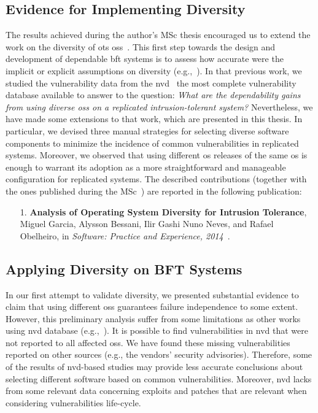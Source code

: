 \subsection{Evidence for Implementing Diversity}%


The results achieved during the author's MSc thesis encouraged us to extend the work on the diversity of \gls{ots} \glspl{os}~\cite{Garcia:2012}.
This first step towards the design and development of dependable \gls{bft} systems is to assess how accurate were the implicit or explicit assumptions on diversity (e.g.,~\cite{Abd-El-Malek:2005,Bessani:2008,Castro:2002,Castro:2003,Clement:2009,Correia:2004,Kapitza:2012,Kotla:2010,Moniz:2011,Yin:2003}).
In that previous work, we studied the vulnerability data from the \gls{nvd}~\cite{nvd} the most complete vulnerability database available to answer to the question:
\emph{What are the dependability gains from using diverse \glspl{os} on a replicated  intrusion-tolerant system?} 
Nevertheless, we have made some extensions to that work, which are presented in this thesis.
In particular, we devised three manual strategies for selecting diverse software components to minimize the incidence of common vulnerabilities in replicated systems.
Moreover, we observed that using different \gls{os} releases of the same \gls{os} is enough to warrant its adoption as a more straightforward and manageable configuration for replicated systems.
The described contributions (together with the ones published during the MSc~\cite{Garcia:2012}) are reported in the following publication:

\begin{enumerate}
\item[1.] \textbf{Analysis of Operating System Diversity for Intrusion Tolerance}, Miguel Garcia, Alysson Bessani, Ilir Gashi Nuno Neves, and Rafael Obelheiro, in \emph{Software: Practice and Experience, 2014}~\cite{Garcia:2014}.
\end{enumerate}



\subsection{Applying Diversity on BFT Systems}
In our first attempt to validate diversity, we presented substantial evidence to claim that using different \glspl{os} guarantees failure independence to some extent.
However, this preliminary analysis suffer from some limitations as other works using \gls{nvd} database (e.g.,~\cite{Han:2009,Frei:2010,Shahzad:2012,Bozorgi:2010,Allodi:2014,Gorbenko:2017}).
It is possible to find vulnerabilities in \gls{nvd} that were not reported to all affected \glspl{os}.
We have found these missing vulnerabilities reported on other sources (e.g., the vendors' security advisories).
Therefore, some of the results of \gls{nvd}-based studies may provide less accurate conclusions about selecting different software based on common vulnerabilities.
Moreover, \gls{nvd} lacks from some relevant data concerning exploits and patches that are relevant when considering vulnerabilities life-cycle.

